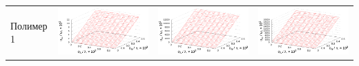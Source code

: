 \documentclass[11pt,a4paper]{article}
\theoremstyle{definition}
\begin{document}
\begin{table}[h]
\begin{tabular}{l | c c c}
	\begin{rotate}{90}Полимер 1\end{rotate} &	\includegraphics[scale=0.4]{figs/all/p1.txt_coeff0.dat.eps} & \includegraphics[scale=0.4]{figs/all/p1.txt_coeff1.dat.eps} & \includegraphics[scale=0.4]{figs/all/p1.txt_coeff2.dat.eps} \\

\end{tabular}
\end{table}
\end{document}
